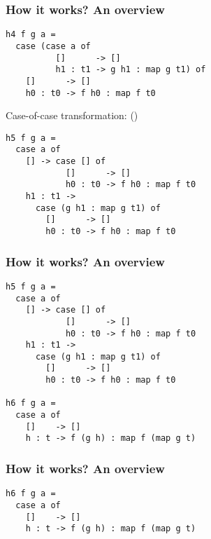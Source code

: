 \documentclass{beamer}
\begin{document}
\begin{frame}[fragile]
    \frametitle{How it works? An overview}
    \begin{verbatim}
h4 f g a =
  case (case a of
          []      -> []
          h1 : t1 -> g h1 : map g t1) of
    []      -> []
    h0 : t0 -> f h0 : map f t0
    \end{verbatim}

    Case-of-case transformation: (\citet{Jones98atransformation-based})

    \begin{verbatim}
h5 f g a =
  case a of
    [] -> case [] of
            []      -> []
            h0 : t0 -> f h0 : map f t0
    h1 : t1 ->
      case (g h1 : map g t1) of
        []      -> []
        h0 : t0 -> f h0 : map f t0
    \end{verbatim}
\end{frame}

\begin{frame}[fragile]
    \frametitle{How it works? An overview}
    \begin{verbatim}
h5 f g a =
  case a of
    [] -> case [] of
            []      -> []
            h0 : t0 -> f h0 : map f t0
    h1 : t1 ->
      case (g h1 : map g t1) of
        []      -> []
        h0 : t0 -> f h0 : map f t0

h6 f g a =
  case a of
    []    -> []
    h : t -> f (g h) : map f (map g t)
    \end{verbatim}
\end{frame}

\begin{frame}[fragile]
    \frametitle{How it works? An overview}
    \begin{verbatim}
h6 f g a =
  case a of
    []    -> []
    h : t -> f (g h) : map f (map g t)
    \end{verbatim}
\end{frame}
\end{document}
